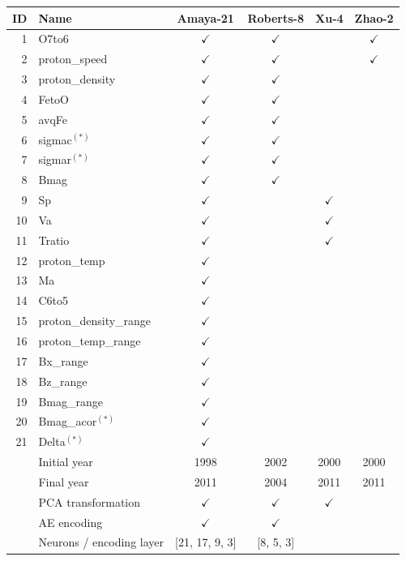 \documentclass[utf8]{frontiersSCNS} %
\begin{document}
\begin{table}\centering
	\begin{tabular}{@{}rlcccc@{}}
		\toprule
		ID & Name  & Amaya-21 & Roberts-8 & Xu-4 & Zhao-2 \\
		\midrule
		1 & O7to6 & $\checkmark$ & $\checkmark$ & & $\checkmark$ \\
		2 & proton\_speed & $\checkmark$ & $\checkmark$ & & $\checkmark$ \\
		3 & proton\_density & $\checkmark$ & $\checkmark$ & & \\
		4 & FetoO & $\checkmark$ & $\checkmark$ & & \\
		5 & avqFe & $\checkmark$ & $\checkmark$ & & \\
		6 & sigmac$^{(*)}$ & $\checkmark$ & $\checkmark$ & & \\
		7 & sigmar$^{(*)}$ & $\checkmark$ & $\checkmark$ & & \\
		8 & Bmag & $\checkmark$ & $\checkmark$ & & \\
		9 & Sp & $\checkmark$ & & $\checkmark$ & \\
		10 & Va & $\checkmark$ & &$\checkmark$ & \\
		11 & Tratio & $\checkmark$ & & $\checkmark$ & \\
		12 & proton\_temp & $\checkmark$ & & & \\
		13 & Ma & $\checkmark$ & & & \\
		14 & C6to5 & $\checkmark$ & & & \\
		15 & proton\_density\_range & $\checkmark$ & & & \\
		16 & proton\_temp\_range & $\checkmark$ & & & \\
		17 & Bx\_range & $\checkmark$ & & & \\
		18 & Bz\_range & $\checkmark$ & & & \\
		19 & Bmag\_range & $\checkmark$ & & & \\
		20 & Bmag\_acor$^{(*)}$ & $\checkmark$ & & & \\
		21 & Delta$^{(*)}$ & $\checkmark$ & & & \\
		\midrule
		 & Initial year & 1998 & 2002 & 2000 & 2000 \\
		 & Final year & 2011 & 2004 & 2011 & 2011 \\
		 \midrule
		 & PCA transformation & $\checkmark$ & $\checkmark$ & $\checkmark$ &  \\
		 & AE encoding & $\checkmark$ & $\checkmark$ & & \\
		 & Neurons / encoding layer & [21, 17, 9, 3] & [8, 5, 3] & & \\

\end{tabular}
\end{table}
\end{document}
